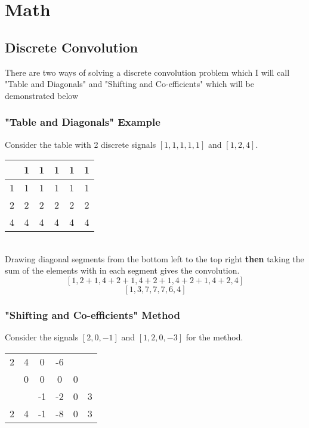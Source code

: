 \documentclass{article}
\begin{document}
\section*{Math}
\subsection*{Discrete Convolution}
There are two ways of solving a discrete convolution problem which I will call "Table and Diagonals" and "Shifting and Co-efficients" which will be demonstrated below
\subsubsection*{"Table and Diagonals" Example}
Consider the table with 2 discrete signals $ [1,1,1,1,1] $ and $ [1,2,4] $.\\
\begin{tabular}{c|ccccc}
	&1&1&1&1&1\\
	\hline
	1&1&1&1&1&1\\
	2&2&2&2&2&2\\
	4&4&4&4&4&4
\end{tabular}\\
Drawing diagonal segments from the bottom left to the top right \textbf{then} taking the sum of the elements with in each segment gives the convolution.
\[ [1, 2+1, 4+2+1, 4+2+1, 4+2+1, 4+2, 4] \]
\[ [1, 3, 7, 7, 7, 6, 4] \]
\subsubsection*{"Shifting and Co-efficients" Method}
Consider the signals $ [2,0,-1] $ and $ [1, 2, 0, -3] $ for the method.\\
\begin{tabular}{cccccc}
	2&4&0&-6&&\\
	&0&0&0&0&\\
	&&-1&-2&0&3\\
	\hline
	2&4&-1&-8&0&3
\end{tabular}
\end{document}
